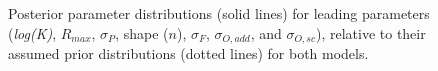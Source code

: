 \documentclass[
  11pt,
]{SCreport}
\begin{document}
\newpage

\begin{figure}[H]


\caption{\label{fig-prior-post}Posterior parameter distributions (solid
lines) for leading parameters (\emph{log(K)}, \(R_{max}\), \(\sigma_P\),
shape (\(n\)), \(\sigma_F\), \(\sigma_{O,add}\), and \(\sigma_{O,sc}\)),
relative to their assumed prior distributions (dotted lines) for both
models.}

\end{figure}%

\newpage
\end{document}
